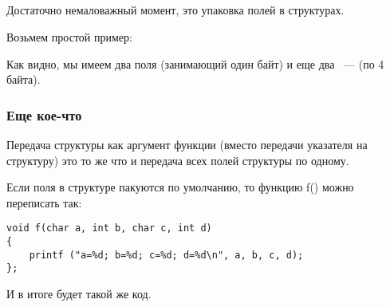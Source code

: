 \subsection{\StructurePackingSectionName}
\label{structure_packing}

Достаточно немаловажный момент, это упаковка полей в структурах.

Возьмем простой пример:



Как видно, мы имеем два поля \Tchar (занимающий один байт) и еще два ~--- \Tint (по 4 байта).





\subsubsection{Еще кое-что}

Передача структуры как аргумент функции (вместо передачи указателя на структуру) это то же
что и передача всех полей структуры по одному.

Если поля в структуре пакуются по умолчанию, то функцию f() можно переписать так:

\begin{lstlisting}[style=customc]
void f(char a, int b, char c, int d)
{
    printf ("a=%d; b=%d; c=%d; d=%d\n", a, b, c, d);
};
\end{lstlisting}

И в итоге будет такой же код.
